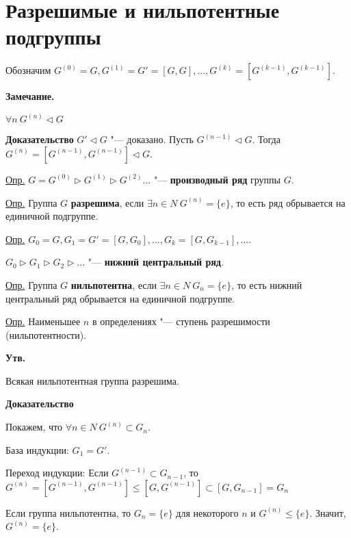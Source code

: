 \documentclass{article}
\begin{document}
\section{Разрешимые и нильпотентные подгруппы}
Обозначим $G^{(0)} = G, G^{(1)} = G' = [G, G], ... , G^{(k)} = [G^{(k-1)}, G^{(k-1)}]$.

\textbf{Замечание.}

$\forall n \  G^{(n)} \triangleleft G$

\textbf{Доказательство}
$G' \triangleleft G$ "--- доказано.
Пусть $G^{(n-1)} \triangleleft G$. Тогда $G^{(n)} = [G^{(n-1)}, G^{(n-1)}] \triangleleft G$.

\vspace{10pt}

\underline{Опр.} $G = G^{(0)} \triangleright G^{(1)}\triangleright G^{(2)} ... $ "--- \textbf{производный ряд} группы $G$.

\underline{Опр.} Группа $G$ \textbf{разрешима}, если $\exists n \in N \  G^{(n)} = \{e\}$, то есть ряд обрывается на единичной подгруппе.

\underline{Опр.} $G_0 = G, G_1 = G' = [G, G_0], ... , G_k = [G, G_{k-1}], ... $.

$G_0 \triangleright G_1 \triangleright G_2 \triangleright ... $ "--- \textbf{нижний центральный ряд}.


\underline{Опр.} Группа $G$ \textbf{нильпотентна}, если $\exists n \in N \  G_n = \{e\}$, то есть нижний центральный ряд обрывается на единичной подгруппе.

\vspace{10pt}

\underline{Опр.} Наименьшее $n$ в определениях "--- ступень разрешимости (нильпотентности).

\vspace{5pt}

\textbf{Утв.}

Всякая нильпотентная группа разрешима.

\textbf{Доказательство}

Покажем, что $\forall n \in N \  G^{(n)} \subset G_n$.

База индукции: $G_1 = G'$.

Переход индукции: Если $G^{(n-1)} \subset G_{n-1}$, то $G^{(n)} = [G^{(n-1)}, G^{(n-1)}] \leq [G, G^{(n-1)}] \subset [G, G_{n-1}] = G_n$

Если группа нильпотентна, то $G_n = \{e\}$ для некоторого $n$ и $G^{(n)} \leq \{e\}$. Значит, $G^{(n)} = \{e\}$.

\vspace{10pt}
\end{document}
